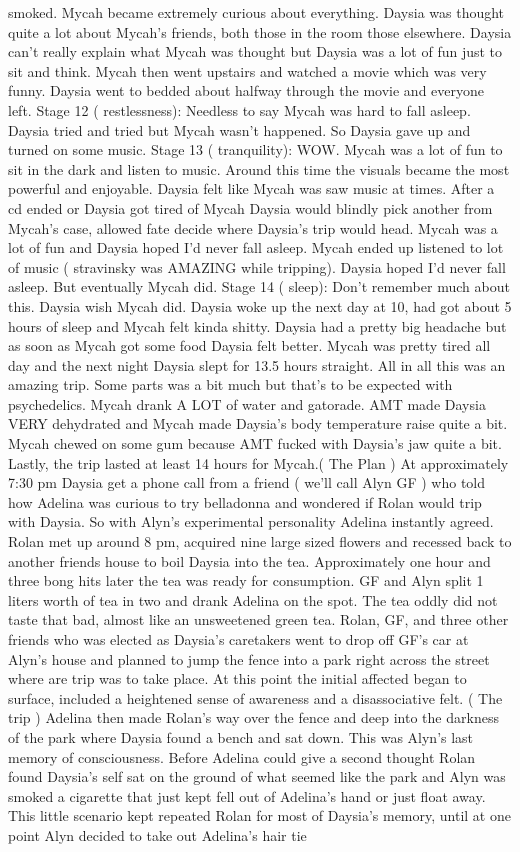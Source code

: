 \documentclass[12pt]{book}
\begin{document}
smoked. Mycah became extremely curious about everything. Daysia was thought quite a lot about Mycah's friends, both those in the room those elsewhere. Daysia can't really explain what Mycah was thought but Daysia was a lot of fun just to sit and think. Mycah then went upstairs and watched a movie which was very funny. Daysia went to bedded about halfway through the movie and everyone left. Stage 12 ( restlessness): Needless to say Mycah was hard to fall asleep. Daysia tried and tried but Mycah wasn't happened. So Daysia gave up and turned on some music. Stage 13 ( tranquility): WOW. Mycah was a lot of fun to sit in the dark and listen to music. Around this time the visuals became the most powerful and enjoyable. Daysia felt like Mycah was saw music at times. After a cd ended or Daysia got tired of Mycah Daysia would blindly pick another from Mycah's case, allowed fate decide where Daysia's trip would head. Mycah was a lot of fun and Daysia hoped I'd never fall asleep. Mycah ended up listened to lot of music ( stravinsky was AMAZING while tripping). Daysia hoped I'd never fall asleep. But eventually Mycah did. Stage 14 ( sleep): Don't remember much about this. Daysia wish Mycah did. Daysia woke up the next day at 10, had got about 5 hours of sleep and Mycah felt kinda shitty. Daysia had a pretty big headache but as soon as Mycah got some food Daysia felt better. Mycah was pretty tired all day and the next night Daysia slept for 13.5 hours straight. All in all this was an amazing trip. Some parts was a bit much but that's to be expected with psychedelics. Mycah drank A LOT of water and gatorade. AMT made Daysia VERY dehydrated and Mycah made Daysia's body temperature raise quite a bit. Mycah chewed on some gum because AMT fucked with Daysia's jaw quite a bit. Lastly, the trip lasted at least 14 hours for Mycah.( The Plan ) At approximately 7:30 pm Daysia get a phone call from a friend ( we'll call Alyn GF ) who told how Adelina was curious to try belladonna and wondered if Rolan would trip with Daysia. So with Alyn's experimental personality Adelina instantly agreed. Rolan met up around 8 pm, acquired nine large sized flowers and recessed back to another friends house to boil Daysia into the tea. Approximately one hour and three bong hits later the tea was ready for consumption. GF and Alyn split 1 liters worth of tea in two and drank Adelina on the spot. The tea oddly did not taste that bad, almost like an unsweetened green tea. Rolan, GF, and three other friends who was elected as Daysia's caretakers went to drop off GF's car at Alyn's house and planned to jump the fence into a park right across the street where are trip was to take place. At this point the initial affected began to surface, included a heightened sense of awareness and a disassociative felt. ( The trip ) Adelina then made Rolan's way over the fence and deep into the darkness of the park where Daysia found a bench and sat down. This was Alyn's last memory of consciousness. Before Adelina could give a second thought Rolan found Daysia's self sat on the ground of what seemed like the park and Alyn was smoked a cigarette that just kept fell out of Adelina's hand or just float away. This little scenario kept repeated Rolan for most of Daysia's memory, until at one point Alyn decided to take out Adelina's hair tie 
\end{document}
